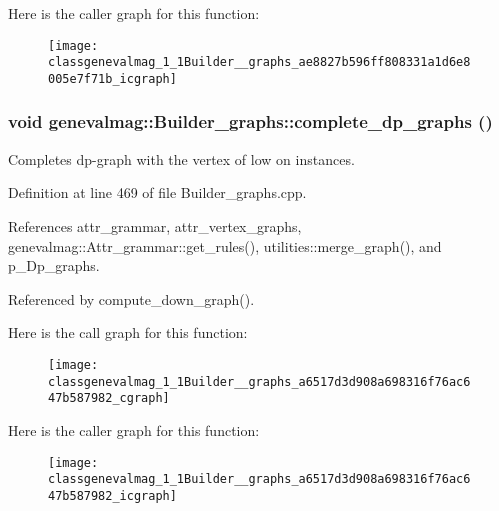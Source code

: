 Here is the caller graph for this function:\nopagebreak
\begin{figure}[H]
\begin{center}
\leavevmode
\texttt{[image: classgenevalmag\_1\_1Builder\_\_graphs\_ae8827b596ff808331a1d6e8005e7f71b\_icgraph]}
\end{center}
\end{figure}


\hypertarget{classgenevalmag_1_1Builder__graphs_a6517d3d908a698316f76ac647b587982}{
\subsubsection[{complete\_\-dp\_\-graphs}]{\setlength{\rightskip}{0pt plus 5cm}void genevalmag::Builder\_\-graphs::complete\_\-dp\_\-graphs ()}}
\label{classgenevalmag_1_1Builder__graphs_a6517d3d908a698316f76ac647b587982}
Completes dp-\/graph with the vertex of low on instances. 

Definition at line 469 of file Builder\_\-graphs.cpp.



References attr\_\-grammar, attr\_\-vertex\_\-graphs, genevalmag::Attr\_\-grammar::get\_\-rules(), utilities::merge\_\-graph(), and p\_\-Dp\_\-graphs.



Referenced by compute\_\-down\_\-graph().



Here is the call graph for this function:\nopagebreak
\begin{figure}[H]
\begin{center}
\leavevmode
\texttt{[image: classgenevalmag\_1\_1Builder\_\_graphs\_a6517d3d908a698316f76ac647b587982\_cgraph]}
\end{center}
\end{figure}




Here is the caller graph for this function:\nopagebreak
\begin{figure}[H]
\begin{center}
\leavevmode
\texttt{[image: classgenevalmag\_1\_1Builder\_\_graphs\_a6517d3d908a698316f76ac647b587982\_icgraph]}
\end{center}
\end{figure}



